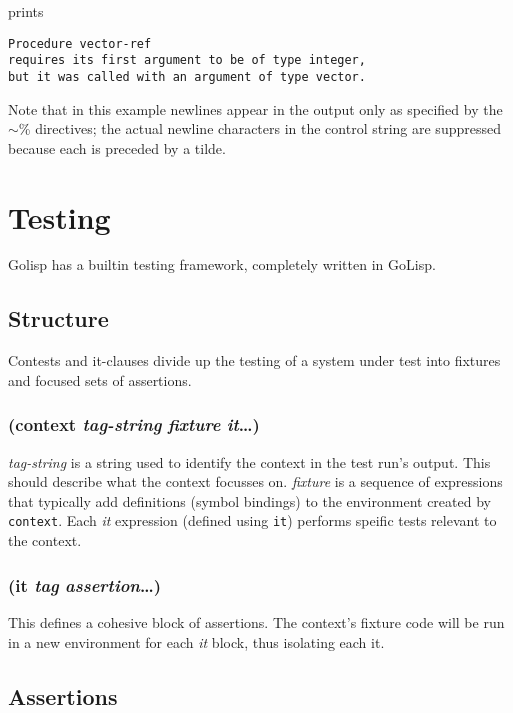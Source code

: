 \documentclass{article}
\begin{document}
prints

\begin{verbatim}
Procedure vector-ref
requires its first argument to be of type integer,
but it was called with an argument of type vector.
\end{verbatim}

Note that in this example newlines appear in the output only as specified by the
\ensuremath{\sim}\% directives; the actual newline characters in the control string are
suppressed because each is preceded by a tilde.

\section{Testing}\label{sec:testing}

Golisp has a builtin testing framework, completely written in GoLisp.

\subsection{Structure}\label{sec:structure}

Contests and it-clauses divide up the testing of a system under test into fixtures and focused
sets of assertions.

\subsubsection{(context \emph{tag-string} \emph{fixture} \emph{it}\ldots{})}

\emph{tag-string} is a string used to identify the context in the test run's output. This
should describe what the context focusses on. \emph{fixture} is a sequence of expressions that
typically add definitions (symbol bindings) to the environment created by \verb|context|.
Each \emph{it} expression (defined using \verb|it|) performs speific tests relevant to the
context.

\subsubsection{(it \emph{tag} \emph{assertion}\ldots{})}

This defines a cohesive block of assertions. The context's fixture code will be run in a new
environment for each \emph{it} block, thus isolating each it.

\subsection{Assertions}\label{sec:assertions}
\end{document}
